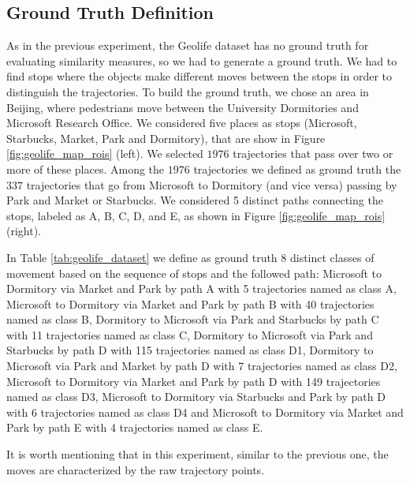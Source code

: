 \subsection{Ground Truth Definition}
{As in the previous experiment, the Geolife dataset has no ground truth for evaluating similarity measures, so we had to generate a ground truth. We had to find stops where the objects make different moves between the stops in order to distinguish the trajectories.}
To build the ground truth, we chose an area in Beijing, where pedestrians move between the University Dormitories and Microsoft Research Office. We considered five places as stops (Microsoft, Starbucks, Market, Park and Dormitory), that are show in Figure \ref{fig:geolife_map_rois} (left). {We selected $1976$ trajectories that pass over two or more of these places. Among the $1976$ trajectories we defined as ground truth the $337$ trajectories that go from Microsoft to Dormitory (and vice versa) passing by Park and Market or Starbucks.} We considered 5 distinct paths connecting the stops, labeled as A, B, C, D, and E, as shown in Figure \ref{fig:geolife_map_rois} (right).

In Table \ref{tab:geolife_dataset} we define as ground truth 8 distinct classes of movement based on the sequence of stops and the followed path: Microsoft to Dormitory via Market and Park by path A with 5 trajectories named as class A, Microsoft to Dormitory via Market and Park by path B with 40 trajectories named as class B, Dormitory to Microsoft via Park and Starbucks by path C with 11 trajectories named as class C, Dormitory to Microsoft via Park and Starbucks by path D with 115 trajectories named as class D1, Dormitory to Microsoft via Park and Market by path D with 7 trajectories named as class D2, Microsoft to Dormitory via Market and Park by path D with 149 trajectories named as class D3, Microsoft to Dormitory via Starbucks and Park by path D with 6 trajectories named as class D4 and Microsoft to Dormitory via Market and Park by path E with 4 trajectories named as class E.

It is worth mentioning that in this experiment, similar to the previous one, the moves are characterized by the raw trajectory points.

